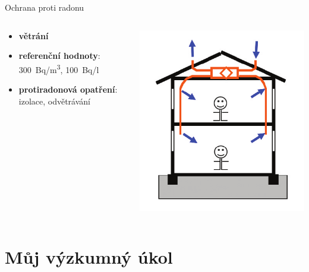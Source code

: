 \documentclass[10pt]{beamer}
\begin{document}
\begin{frame}{Ochrana proti radonu}
    \small
    \begin{columns}
        \begin{column}{0.49\textwidth}
            \begin{itemize}
                \item \textbf{větrání}
                \item \textbf{referenční hodnoty}: \SI{300}{Bq/m^3}, \SI{100}{Bq/l}
                \item \textbf{protiradonová opatření}: izolace, odvětrávání
            \end{itemize}
        \end{column}
        \begin{column}{0.49\textwidth}
            \includegraphics[width=.9\textwidth]{opatreni.png}
            \cite{jiranek}
        \end{column}
    \end{columns}
\end{frame}

\section{Můj výzkumný úkol}
\end{document}
